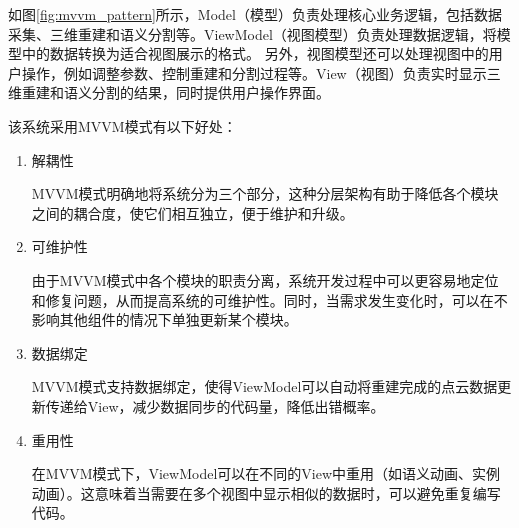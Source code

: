 \par 如图\ref{fig:mvvm_pattern}所示，Model（模型）负责处理核心业务逻辑，包括数据采集、三维重建和语义分割等。ViewModel（视图模型）负责处理数据逻辑，将模型中的数据转换为适合视图展示的格式。
另外，视图模型还可以处理视图中的用户操作，例如调整参数、控制重建和分割过程等。View（视图）负责实时显示三维重建和语义分割的结果，同时提供用户操作界面。

\par 该系统采用MVVM模式有以下好处：

\begin{enumerate}
	\item{解耦性}
	\par MVVM模式明确地将系统分为三个部分，这种分层架构有助于降低各个模块之间的耦合度，使它们相互独立，便于维护和升级。

	\item{可维护性}
	\par 由于MVVM模式中各个模块的职责分离，系统开发过程中可以更容易地定位和修复问题，从而提高系统的可维护性。同时，当需求发生变化时，可以在不影响其他组件的情况下单独更新某个模块。

	\item{数据绑定}
	\par MVVM模式支持数据绑定，使得ViewModel可以自动将重建完成的点云数据更新传递给View，减少数据同步的代码量，降低出错概率。

	\item{重用性}
	\par 在MVVM模式下，ViewModel可以在不同的View中重用（如语义动画、实例动画）。这意味着当需要在多个视图中显示相似的数据时，可以避免重复编写代码。
\end{enumerate}